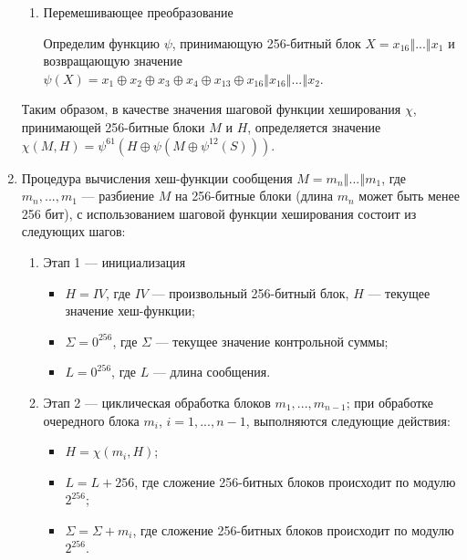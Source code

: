 \documentclass{./civarticle}
\begin{document}
\begin{enumerate}
\begin{enumerate}
        \item Перемешивающее преобразование

        Определим функцию $\psi$, принимающую 256-битный блок $X = x_{16} \mathbin\Vert ... \mathbin\Vert x_1$ и возвращающую значение $\psi(X) = x_{1} \oplus x_2 \oplus x_3 \oplus x_4 \oplus x_{13} \oplus x_{16} \mathbin\Vert x_{16} \mathbin\Vert ... \mathbin\Vert x_2$.
        
    \end{enumerate}

    Таким образом, в качестве значения шаговой функции хеширования $\chi$, принимающей 256-битные блоки $M$ и $H$, определяется значение $\chi(M, H) = \psi^{61}(H \oplus \psi(M \oplus \psi^{12}(S)))$.

    \item Процедура вычисления хеш-функции сообщения $M = m_n \mathbin\Vert ... \mathbin\Vert m_1$, где $m_n, ..., m_1$ --- разбиение $M$ на 256-битные блоки (длина $m_n$ может быть менее 256 бит), с использованием шаговой функции хеширования состоит из следующих шагов:

    \begin{enumerate}
        \item Этап 1 --- инициализация

        \begin{itemize}
            \item $H = IV$, где $IV$ --- произвольный 256-битный блок, $H$ --- текущее значение хеш-функции;
            \item $\Sigma = 0^{256}$, где $\Sigma$ --- текущее значение контрольной суммы;
            \item $L = 0^{256}$, где $L$ --- длина сообщения.
        \end{itemize}

        \item Этап 2 --- циклическая обработка блоков $m_1, ..., m_{n-1}$; при обработке очередного блока $m_i$, $i = 1, ..., n-1$, выполняются следующие действия:

        \begin{itemize}
            \item $H = \chi(m_i, H)$;
            \item $L = L + 256$, где сложение 256-битных блоков происходит по модулю $2^{256}$;
            \item $\Sigma = \Sigma + m_i$, где сложение 256-битных блоков происходит по модулю $2^{256}$.
        \end{itemize}


\end{enumerate}
\end{enumerate}
\end{document}

